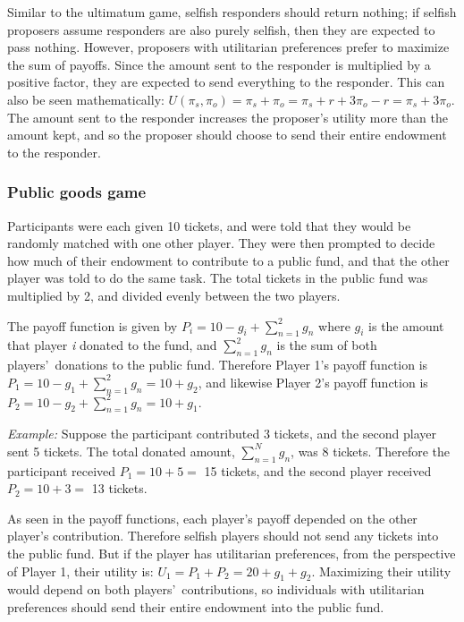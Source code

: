 \documentclass[12pt]{article}
\begin{document}
Similar to the ultimatum game, selfish responders should return nothing; if selfish proposers assume responders are also purely selfish, then they are expected to pass nothing. However, proposers with utilitarian preferences prefer to maximize the sum of payoffs. Since the amount sent to the responder is multiplied by a positive factor, they are expected to send everything to the responder. This can also be seen mathematically: \(U(\pi_{s}, \pi_{o}) = \pi_{s} + \pi_{o} = \pi_{s} + r + 3\pi_{o} - r = \pi_{s} + 3\pi_{o} \). The amount sent to the responder increases the proposer\rq s utility more than the amount kept, and so the proposer should choose to send their entire endowment to the responder.
	
\subsubsection{Public goods game}

Participants were each given 10 tickets, and were told that they would be randomly matched with one other player. They were then prompted to decide how much of their endowment to contribute to a public fund, and that the other player was told to do the same task. The total tickets in the public fund was multiplied by 2, and divided evenly between the two players.

The payoff function is given by \( P_{i} = 10 - g_{i} + \sum_{n=1}^{2} g_{n}\) where \(g_{i}\) is the amount that player \textit{i} donated to the fund, and \(\sum_{n=1}^{2}g_{n}\) is the sum of both players\rq \ donations to the public fund. Therefore Player 1\rq s payoff function is \( P_{1} = 10 - g_{1} + \sum_{n=1}^{2} g_{n} = 10 + g_{2}\), and likewise Player 2\rq s payoff function is \( P_{2} = 10 - g_{2} + \sum_{n=1}^{2} g_{n} = 10 + g_{1}\).

\textit{Example:} Suppose the participant contributed 3 tickets, and the second player sent 5 tickets. The total donated amount, \(\sum_{n=1}^{N} g_{n}\), was 8 tickets. Therefore the participant received \( P_{1} = 10 + 5  = \) 15 tickets, and the second player received \( P_{2} = 10 + 3 = \) 13 tickets.

As seen in the payoff functions, each player\rq s payoff depended on the other player\rq s contribution. Therefore selfish players should not send any tickets into the public fund. But if the player has utilitarian preferences, from the perspective of Player 1, their utility is: \(U_{1} = P_{1} + P_{2} =  20 + g_{1} + g_{2}\). Maximizing their utility would depend on both players\rq \ contributions, so individuals with utilitarian preferences should send their entire endowment into the public fund.
\end{document}
